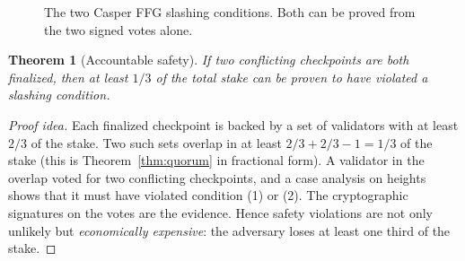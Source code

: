 \documentclass[11pt,a4paper]{article}
\newenvironment{formal}{\par\smallskip}{\par\smallskip}
\theoremstyle{definition}
\theoremstyle{plain}
\newtheorem{theorem}[definition]{Theorem}
\theoremstyle{remark}
\begin{document}
\begin{formal}
\begin{figure}[htbp]
\centering
{}
\caption{The two Casper FFG slashing conditions. Both can be proved from the two signed votes alone.}
\end{figure}
\begin{theorem}[Accountable safety]
If two conflicting checkpoints are both finalized, then at least $1/3$ of the total stake can be proven to have violated a slashing condition.
\end{theorem}
\begin{proof}[Proof idea]
Each finalized checkpoint is backed by a set of validators with at least $2/3$ of the stake. Two such sets overlap in at least $2/3+2/3-1=1/3$ of the stake (this is Theorem~\ref{thm:quorum} in fractional form). A validator in the overlap voted for two conflicting checkpoints,
and a case analysis on heights shows that it must have violated condition (1) or (2). The cryptographic signatures on the votes are the evidence. Hence safety violations are not only unlikely but \emph{economically expensive}: the adversary loses at least one third of the stake.
\end{proof}
\end{formal}
\end{document}

